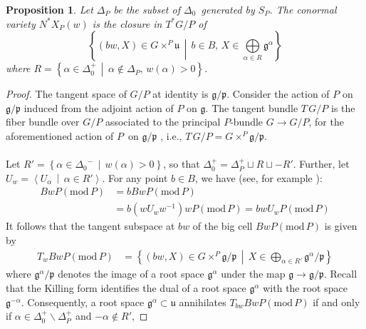 \documentclass[paper=a4, fontsize=10pt]{amsart} %
\theoremstyle{plain}
\newtheorem{prop}[subsection]{Proposition}
\theoremstyle{definition}
\theoremstyle{remark}
\numberwithin{equation}{section} %
\numberwithin{figure}{section} %
\numberwithin{table}{section} %
\numberwithin{subsection}{section} %
\def\mid{\,\middle\vert\,}
\def\borel{\ensuremath{B}}
\def\roots{\ensuremath{\Delta_0}}
\def\proots{\ensuremath{\Delta_0^+}}
\def\Roots{\ensuremath{\Delta}}
\def\gl{\ensuremath{G}}
\def\lgl{\ensuremath{\mathfrak g}}
\def\para{\ensuremath{P}}
\def\u{\ensuremath{\mathfrak u}}
\def\mod{\ensuremath{\mathrm{mod}\,}}
\begin{document}
\begin{prop}
\label{prop:uw}
Let $\Roots_P$ be the subset of \roots\ generated by $S_P$. 
The conormal variety $N^* X_P(w)$ is the closure in $T^*\gl/P$ of 
$$  \left\{(bw,X)\in\gl\times^P\u\mid b\in\borel,\,X\in\bigoplus\limits_{\alpha\in R}\lgl^\alpha\right\}$$
where $R=\left\{\alpha\in\proots\mid\alpha\not\in\Roots_P,\,w(\alpha)>0\right\}$.
\end{prop}
\begin{proof}
The tangent space of $G/P$ at identity is $\lgl/\mathfrak p$. 
Consider the action of $P$ on $\lgl/\mathfrak p$ induced from the adjoint action of $P$ on $\lgl$.
The tangent bundle $T\,\gl/\para$ is the fiber bundle over $\gl/\para$ associated to the principal \para-bundle $\gl\rightarrow\gl/\para$, for the aforementioned action of \para\ on $\lgl/\mathfrak p$
, i.e., $T\,\gl/\para=\gl\times^\para\lgl/\mathfrak p$.
\\
\\
Let $R'=\left\{\alpha\in\roots^-\mid w(\alpha)>0\right\}$, 
so that $\proots=\Roots^+_P\sqcup R\sqcup -R'$.
Further, let $U_w=\left\langle U_\alpha\mid\alpha\in R'\right\rangle$.
For any point $b\in B$, we have (see, for example \cite{stein}):\begin{align*}
    BwP(\mod P) &=bBwP(\mod P)\\
                &=b(wU_ww^{-1})wP(\mod P)=bwU_wP(\mod P)
\end{align*}
It follows that the tangent subspace at $bw$ of the big cell $BwP(\mod P)$ is given by
\begin{align*}
    T_wBwP(\mod P)&=\left\{(bw,X)\in G\times^P\lgl/\mathfrak p\mid X\in\bigoplus\limits_{\alpha\in R'}\lgl^\alpha/\mathfrak p\right\}
\end{align*}
where %
$\lgl^\alpha/\mathfrak p$ denotes the image of a root space $\lgl^\alpha$ under the map $\lgl\rightarrow\lgl/\mathfrak p$.
Recall that the Killing form identifies the dual of a root space $\lgl^\alpha$ with the root space $\lgl^{-\alpha}$. 
Consequently, a root space $\lgl^\alpha\subset\u$ annihilates $T_{bw}BwP(\mod P)$ if and only if $\alpha\in\proots\backslash\Roots_P^+$ and $-\alpha\not\in R'$,

\end{proof}
\end{document}
